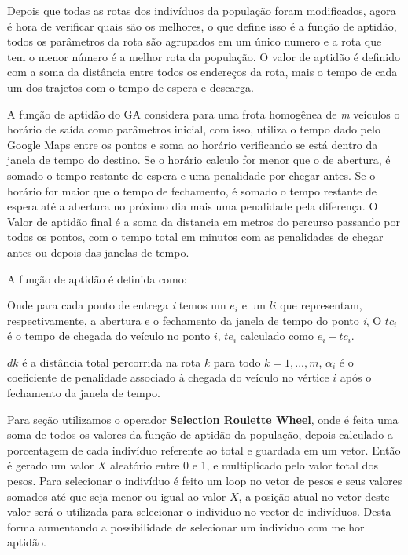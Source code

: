 Depois que todas as rotas dos indivíduos da população foram modificados, agora é hora de verificar quais são os melhores, o que define isso é a função de aptidão, todos os parâmetros da rota são agrupados em um único numero e a rota que tem o menor número é a melhor rota da população. O valor de aptidão é definido com a soma da distância entre todos os endereços da rota, mais o tempo de cada um dos trajetos com o tempo de espera e descarga.

A função de aptidão do GA considera para uma frota homogênea de \textit{m} veículos o horário de saída como parâmetros inicial, com isso, utiliza o tempo dado pelo Google Maps entre os pontos e soma ao horário verificando se está dentro da janela de tempo do destino. Se o horário calculo for menor que o de abertura, é somado o tempo restante de espera e uma penalidade por chegar antes. Se o horário for maior que o tempo de fechamento, é somado o tempo restante de espera até a abertura no próximo dia mais uma penalidade pela diferença. O Valor de aptidão final é a soma da distancia em metros do percurso passando por todos os pontos, com o tempo total em minutos com as penalidades de chegar antes ou depois das janelas de tempo.

A função de aptidão é definida como:

\begin{center}
	\label{fig:MetodoAptidao}
\end{center}

Onde para cada ponto de entrega \textit{i} temos um \(e_i\)
e um \(li\)  que representam, respectivamente, a abertura e o fechamento
da janela de tempo do ponto \textit{i}, O \(tc_i\) é o tempo de chegada do veículo no ponto \(i\), \(te_i\) calculado como \(e_i - tc_i\). 

\(dk\) é a distância total percorrida na rota $k$ para todo $k=1,...,m$, \(\alpha_i\) é o coeficiente de penalidade associado à chegada do veículo no vértice $i$ após o fechamento da janela de tempo.

Para seção utilizamos o operador \textbf{Selection Roulette Wheel}, onde é feita uma soma de todos os valores da função de aptidão da população, depois calculado a porcentagem de cada indivíduo referente ao total e guardada em um vetor. Então é gerado um valor $X$ aleatório entre 0 e 1, e multiplicado pelo valor total dos pesos. 
Para selecionar o indivíduo é feito um loop no vetor de pesos e seus valores somados até que seja menor ou igual ao valor $X$, a posição atual no vetor deste valor será o utilizada para selecionar o individuo no vector de indivíduos. 
Desta forma aumentando a possibilidade de selecionar um indivíduo com melhor aptidão.


